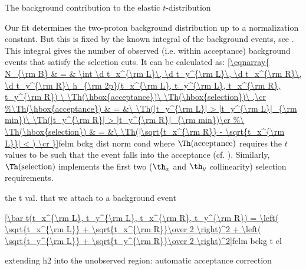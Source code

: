 
\caption{The background contribution to the elastic $t$-distribution}

Our fit  determines the two-proton background distribution  up to a normalization constant. But this is fixed by the known integral of the background events, see . This integral gives the number of observed (i.e. within acceptance) background events that satisfy the selection cuts. It can be calculated as:
\eqref{\eqnarray{
N_{\rm B} & = & \int \d t_x^{\rm L}\, \d t_y^{\rm L}\, \d t_x^{\rm R}\, \d t_y^{\rm R}\ h_{\rm 2p}(t_x^{\rm L}, t_y^{\rm L}, t_x^{\rm R}, t_y^{\rm R})
	\ \Th(\hbox{acceptance})\ \Th(\hbox{selection})\ ,\cr
}}{felm bckg dist norm cond}
where $\Th(\hbox{acceptance})$ requires the $t$ values to be such that the event falls into the acceptance (cf. ). Similarly, $\Th(\hbox{selection})$ implements the first two ($\th_x$ and $\th_y$ collinearity) selection requirements.

\> the t val. that we attach to a background event

\eqref{\bar t(t_x^{\rm L}, t_y^{\rm L}, t_x^{\rm R}, t_y^{\rm R})
= \left( \sqrt{t_x^{\rm L}} + \sqrt{t_x^{\rm R}}\over 2 \right)^2 + \left( \sqrt{t_y^{\rm L}} + \sqrt{t_y^{\rm R}}\over 2 \right)^2}{felm bckg t el}

\> extending h2 into the unobserved region: automatic acceptance correction

